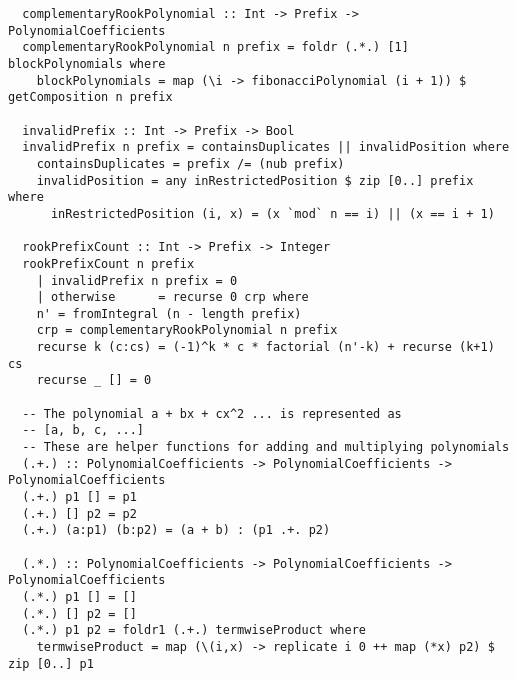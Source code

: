 \begin{lstlisting}
  complementaryRookPolynomial :: Int -> Prefix -> PolynomialCoefficients
  complementaryRookPolynomial n prefix = foldr (.*.) [1] blockPolynomials where
    blockPolynomials = map (\i -> fibonacciPolynomial (i + 1)) $ getComposition n prefix

  invalidPrefix :: Int -> Prefix -> Bool
  invalidPrefix n prefix = containsDuplicates || invalidPosition where
    containsDuplicates = prefix /= (nub prefix)
    invalidPosition = any inRestrictedPosition $ zip [0..] prefix where
      inRestrictedPosition (i, x) = (x `mod` n == i) || (x == i + 1)

  rookPrefixCount :: Int -> Prefix -> Integer
  rookPrefixCount n prefix
    | invalidPrefix n prefix = 0
    | otherwise      = recurse 0 crp where
    n' = fromIntegral (n - length prefix)
    crp = complementaryRookPolynomial n prefix
    recurse k (c:cs) = (-1)^k * c * factorial (n'-k) + recurse (k+1) cs
    recurse _ [] = 0

  -- The polynomial a + bx + cx^2 ... is represented as
  -- [a, b, c, ...]
  -- These are helper functions for adding and multiplying polynomials
  (.+.) :: PolynomialCoefficients -> PolynomialCoefficients -> PolynomialCoefficients
  (.+.) p1 [] = p1
  (.+.) [] p2 = p2
  (.+.) (a:p1) (b:p2) = (a + b) : (p1 .+. p2)

  (.*.) :: PolynomialCoefficients -> PolynomialCoefficients -> PolynomialCoefficients
  (.*.) p1 [] = []
  (.*.) [] p2 = []
  (.*.) p1 p2 = foldr1 (.+.) termwiseProduct where
    termwiseProduct = map (\(i,x) -> replicate i 0 ++ map (*x) p2) $ zip [0..] p1
\end{lstlisting}

